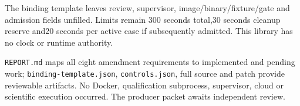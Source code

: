\documentclass[10pt]{article}\usepackage[margin=0.8in]{geometry}\usepackage[T1]{fontenc}\usepackage{lmodern,hyperref}
\begin{document}
The binding template leaves review, supervisor, image/binary/fixture/gate and admission fields unfilled. Limits remain 300 seconds total,30 seconds cleanup reserve and20 seconds per active case if subsequently admitted. This library has no clock or runtime authority.

\texttt{REPORT.md} maps all eight amendment requirements to implemented and pending work; \texttt{binding-template.json}, \texttt{controls.json}, full source and patch provide reviewable artifacts. No Docker, qualification subprocess, supervisor, cloud or scientific execution occurred. The producer packet awaits independent review.
\end{document}
